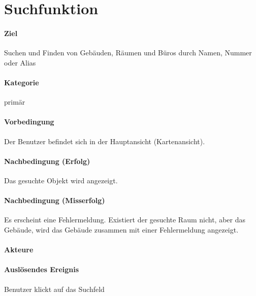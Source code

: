 \section{Suchfunktion}
\paragraph{Ziel}
Suchen und Finden von Gebäuden, Räumen und Büros durch Namen, Nummer oder Alias
\paragraph{Kategorie}
primär
\paragraph{Vorbedingung}
Der Benutzer befindet sich in der Hauptansicht (Kartenansicht).
\paragraph{Nachbedingung (Erfolg)}
Das gesuchte Objekt wird angezeigt.
\paragraph{Nachbedingung (Misserfolg)}
Es erscheint eine Fehlermeldung. Existiert der gesuchte Raum nicht, aber das Gebäude, wird das Gebäude zusammen mit einer Fehlermeldung angezeigt.
\paragraph{Akteure}

\paragraph{Auslösendes Ereignis}
Benutzer klickt auf das Suchfeld
